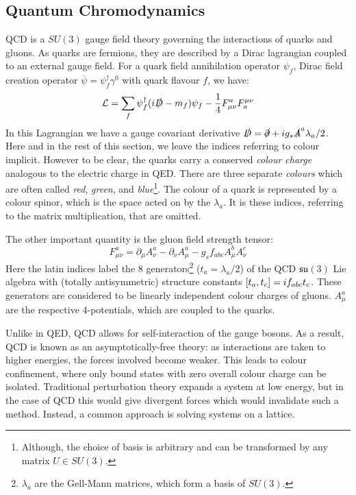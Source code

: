 \documentclass[a4paper,12pt]{article}
\begin{document}
\subsection{Quantum Chromodynamics}
QCD is a $SU(3)$ gauge field theory governing the interactions of quarks and gluons. As quarks are fermions, they are described by a Dirac lagrangian coupled to an external gauge field. For a quark field annihilation operator $\psi_f$, Dirac field creation operator $\overline{\psi}=\psi^\dagger_f\gamma^0$ with quark flavour $f$, we have\cite{2010QFT, 2015Colquhoun}:
\begin{equation}
    \label{eq:Dirac}
    \mathcal{L} = \sum_f \psi^\dagger_f (i\slashed{D}-m_f) \psi_f - \frac{1}{4}F^a_{\mu\nu} F^{\mu\nu}_a
\end{equation}
In this Lagrangian we have a gauge covariant derivative $\slashed{D} = \slashed{\partial} + i g_s \slashed{A}^a \lambda_a / 2$. Here and in the rest of this section, we leave the indices referring to colour implicit. However to be clear, the quarks carry a conserved \emph{colour charge} analogous to the electric charge in QED\@. There are three separate \emph{colours} which are often called \emph{red}, \emph{green}, and \emph{blue}\footnote{Although, the choice of basis is arbitrary and can be transformed by any matrix $U \in SU(3)$.}. The colour of a quark is represented by a colour spinor, which is the space acted on by the $\lambda_a$. It is these indices, referring to the matrix multiplication, that are omitted.

The other important quantity is the gluon field strength tensor:
\begin{equation}
    \label{eq:FieldTensor}
    F^a_{\mu\nu} = \partial_\mu A_\nu^a - \partial_\nu A_\mu^a - g_s f_{abc} A_\mu^b A_\nu^c
\end{equation}
Here the latin indices label the 8 generators\footnote{$\lambda_a$ are the Gell-Mann matrices, which form a basis of $SU(3)$.} ($t_a = \lambda_a/2$) of the QCD $\mathfrak{su}(3)$ Lie algebra with (totally antisymmetric) structure constants $\comm{t_a}{t_c} = i f_{abc} t_c$. These generators are considered to be linearly independent colour charges of gluons. $A_\mu^a$ are the respective 4-potentials, which are coupled to the quarks.

Unlike in QED, QCD allows for self-interaction of the gauge bosons. As a result, QCD is known as an asymptotically-free theory: as interactions are taken to higher energies, the forces involved become weaker. This leads to colour confinement, where only bound states with zero overall colour charge can be isolated. Traditional perturbation theory expands a system at low energy, but in the case of QCD this would give divergent forces which would invalidate such a method. Instead, a common approach is solving systems on a lattice.
\end{document}
